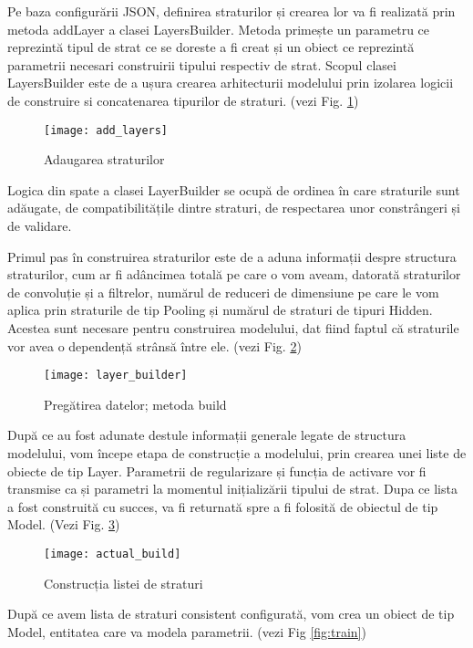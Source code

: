 	
	Pe baza configurării JSON, definirea straturilor și crearea lor va fi realizată prin metoda addLayer a clasei LayersBuilder. Metoda primește un parametru ce reprezintă tipul de strat ce se doreste a fi creat și un obiect ce reprezintă parametrii necesari construirii tipului respectiv de strat. Scopul clasei LayersBuilder este de a ușura crearea arhitecturii modelului prin izolarea logicii de construire si concatenarea tipurilor de straturi. (vezi Fig. \ref{fig:add_layers})	
	
	\begin{figure}[H]
		\texttt{[image: add\_layers]}
		\caption{\label{fig:add_layers} Adaugarea straturilor}
	\end{figure}

	Logica din spate a clasei LayerBuilder se ocupă de ordinea în care straturile sunt adăugate, de compatibilitățile dintre straturi, de respectarea unor constrângeri și de validare.
	
	Primul pas în construirea straturilor este de a aduna informații despre structura straturilor, cum ar fi adâncimea totală pe care o vom aveam, datorată straturilor de convoluție și a filtrelor,  numărul de reduceri de dimensiune pe care le vom aplica prin straturile de tip Pooling și numărul de straturi de tipuri Hidden. Acestea sunt necesare pentru construirea modelului, dat fiind faptul că straturile vor avea o dependență strânsă între ele.  (vezi Fig. \ref{fig:layer_builder})
	
	\begin{figure}[H]
		\texttt{[image: layer\_builder]}
		\caption{\label{fig:layer_builder} Pregătirea datelor; metoda build}
	\end{figure}
	

	După ce au fost adunate destule informații generale legate de structura modelului, vom începe etapa de construcție a modelului, prin crearea unei liste de obiecte de tip Layer. Parametrii de regularizare și funcția de activare vor fi transmise ca și parametri la momentul inițializării tipului de strat. Dupa ce lista a fost construită cu succes,  va fi returnată spre a fi folosită de obiectul de tip Model. (Vezi Fig. \ref{fig:actual_build})
	
	
	\begin{figure}[H]
		\texttt{[image: actual\_build]}
		\caption{\label{fig:actual_build} Construcția listei de straturi}
	\end{figure}


	După ce avem lista de straturi consistent configurată, vom crea un obiect de tip Model, entitatea care va modela parametrii. (vezi Fig \ref{fig:train})
	
